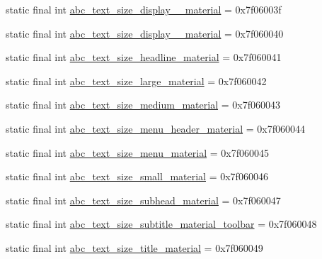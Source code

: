 \begin{DoxyCompactItemize}
static final int \mbox{\hyperlink{classcom_1_1synnapps_1_1carouselview_1_1_r_1_1dimen_a497586f3b7d1e05130a0a9d6b3d6040e}{abc\+\_\+text\+\_\+size\+\_\+display\+\_\+\_\+material}} = 0x7f06003f
\item 
static final int \mbox{\hyperlink{classcom_1_1synnapps_1_1carouselview_1_1_r_1_1dimen_ad19db83a1480710f7ff660627e9ad383}{abc\+\_\+text\+\_\+size\+\_\+display\+\_\+\_\+material}} = 0x7f060040
\item 
static final int \mbox{\hyperlink{classcom_1_1synnapps_1_1carouselview_1_1_r_1_1dimen_a503a826821124ef1dc47923c861a0704}{abc\+\_\+text\+\_\+size\+\_\+headline\+\_\+material}} = 0x7f060041
\item 
static final int \mbox{\hyperlink{classcom_1_1synnapps_1_1carouselview_1_1_r_1_1dimen_a27b6dfc04652880464b5d6040820ccca}{abc\+\_\+text\+\_\+size\+\_\+large\+\_\+material}} = 0x7f060042
\item 
static final int \mbox{\hyperlink{classcom_1_1synnapps_1_1carouselview_1_1_r_1_1dimen_a69d84f8e94169ef8ae9b6da4c8e7400d}{abc\+\_\+text\+\_\+size\+\_\+medium\+\_\+material}} = 0x7f060043
\item 
static final int \mbox{\hyperlink{classcom_1_1synnapps_1_1carouselview_1_1_r_1_1dimen_ae4a98118a2012d0b97d43fabf28e2fc3}{abc\+\_\+text\+\_\+size\+\_\+menu\+\_\+header\+\_\+material}} = 0x7f060044
\item 
static final int \mbox{\hyperlink{classcom_1_1synnapps_1_1carouselview_1_1_r_1_1dimen_a032fb568142a44f3bf973b4b5d51535b}{abc\+\_\+text\+\_\+size\+\_\+menu\+\_\+material}} = 0x7f060045
\item 
static final int \mbox{\hyperlink{classcom_1_1synnapps_1_1carouselview_1_1_r_1_1dimen_a1fd8db5a97553713d6eea47b8c7b97a9}{abc\+\_\+text\+\_\+size\+\_\+small\+\_\+material}} = 0x7f060046
\item 
static final int \mbox{\hyperlink{classcom_1_1synnapps_1_1carouselview_1_1_r_1_1dimen_afc009d1231e340f3bdcd920695c1a801}{abc\+\_\+text\+\_\+size\+\_\+subhead\+\_\+material}} = 0x7f060047
\item 
static final int \mbox{\hyperlink{classcom_1_1synnapps_1_1carouselview_1_1_r_1_1dimen_a56e9c4c2f71b85f92d6d3d18c3a6f776}{abc\+\_\+text\+\_\+size\+\_\+subtitle\+\_\+material\+\_\+toolbar}} = 0x7f060048
\item 
static final int \mbox{\hyperlink{classcom_1_1synnapps_1_1carouselview_1_1_r_1_1dimen_a9baac628b076869ba112e82a11abc27f}{abc\+\_\+text\+\_\+size\+\_\+title\+\_\+material}} = 0x7f060049
\item 

\end{DoxyCompactItemize}
